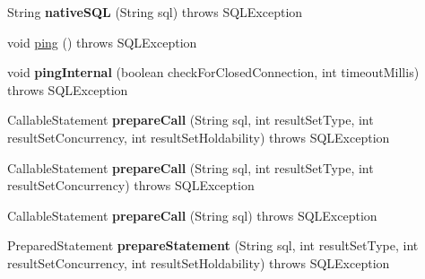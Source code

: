 \begin{DoxyCompactItemize}
\item 
\mbox{\label{classcom_1_1mysql_1_1cj_1_1jdbc_1_1ha_1_1_multi_host_my_s_q_l_connection_a29b987e63be332899cde99fd0843e806}} 
String {\bfseries native\+S\+QL} (String sql)  throws S\+Q\+L\+Exception 
\item 
void \mbox{\hyperlink{classcom_1_1mysql_1_1cj_1_1jdbc_1_1ha_1_1_multi_host_my_s_q_l_connection_a75f3a66c04a2960e920a6e57a3279556}{ping}} ()  throws S\+Q\+L\+Exception 
\item 
\mbox{\label{classcom_1_1mysql_1_1cj_1_1jdbc_1_1ha_1_1_multi_host_my_s_q_l_connection_a491d262b3c772b5b3f9763a82119afed}} 
void {\bfseries ping\+Internal} (boolean check\+For\+Closed\+Connection, int timeout\+Millis)  throws S\+Q\+L\+Exception 
\item 
\mbox{\label{classcom_1_1mysql_1_1cj_1_1jdbc_1_1ha_1_1_multi_host_my_s_q_l_connection_adc6996979c6328df33a21c05ce3a6636}} 
Callable\+Statement {\bfseries prepare\+Call} (String sql, int result\+Set\+Type, int result\+Set\+Concurrency, int result\+Set\+Holdability)  throws S\+Q\+L\+Exception 
\item 
\mbox{\label{classcom_1_1mysql_1_1cj_1_1jdbc_1_1ha_1_1_multi_host_my_s_q_l_connection_a5333a6b37a33a1c124cb80fd9d498052}} 
Callable\+Statement {\bfseries prepare\+Call} (String sql, int result\+Set\+Type, int result\+Set\+Concurrency)  throws S\+Q\+L\+Exception 
\item 
\mbox{\label{classcom_1_1mysql_1_1cj_1_1jdbc_1_1ha_1_1_multi_host_my_s_q_l_connection_acc31ece42a098ce7d2c7f9caabb12be0}} 
Callable\+Statement {\bfseries prepare\+Call} (String sql)  throws S\+Q\+L\+Exception 
\item 
\mbox{\label{classcom_1_1mysql_1_1cj_1_1jdbc_1_1ha_1_1_multi_host_my_s_q_l_connection_ac89505b40f72ef452508c241a4197906}} 
Prepared\+Statement {\bfseries prepare\+Statement} (String sql, int result\+Set\+Type, int result\+Set\+Concurrency, int result\+Set\+Holdability)  throws S\+Q\+L\+Exception 

\end{DoxyCompactItemize}
